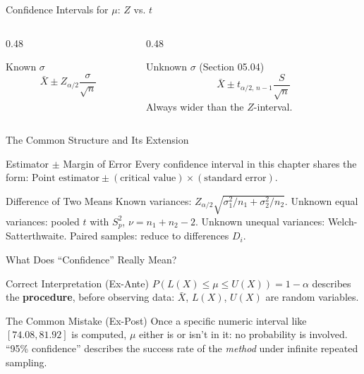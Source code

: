 \documentclass[aspectratio=169,xcolor={dvipsnames,table}]{beamer}
\begin{document}
\begin{frame}{Confidence Intervals for $\mu$: $Z$ vs. $t$}
	\vspace{-0.15cm}
	\begin{columns}[T]
		\begin{column}{0.48\textwidth}
			\begin{block}{Known $\sigma$}
				\footnotesize
				$$\bar X \pm Z_{\alpha/2}\dfrac{\sigma}{\sqrt n}$$
			\end{block}
		\end{column}
		\begin{column}{0.48\textwidth}
			\begin{alertblock}{Unknown $\sigma$ (Section 05.04)}
				\footnotesize
				$$\bar X \pm t_{\alpha/2,\,n-1}\dfrac{S}{\sqrt n}$$
				Always wider than the $Z$-interval.
			\end{alertblock}
		\end{column}
	\end{columns}
\end{frame}

\begin{frame}{The Common Structure and Its Extension}
	\vspace{-0.15cm}
	\begin{block}{Estimator $\pm$ Margin of Error}
		\footnotesize
		Every confidence interval in this chapter shares the form: $\text{Point estimator} \pm (\text{critical value}) \times (\text{standard error})$.
	\end{block}
	\pause
	\vspace{0.1cm}
	\begin{alertblock}{Difference of Two Means}
		\footnotesize
		Known variances: $Z_{\alpha/2}\sqrt{\sigma_1^2/n_1+\sigma_2^2/n_2}$. Unknown equal variances: pooled $t$ with $S_p^2$, $\nu=n_1+n_2-2$. Unknown unequal variances: Welch-Satterthwaite. Paired samples: reduce to differences $D_i$.
	\end{alertblock}
\end{frame}

\begin{frame}{What Does ``Confidence'' Really Mean?}
	\vspace{-0.15cm}
	\begin{block}{Correct Interpretation (Ex-Ante)}
		\footnotesize
		$P(L(X) \le \mu \le U(X)) = 1-\alpha$ describes the \textbf{procedure}, before observing data: $\bar X$, $L(X)$, $U(X)$ are random variables.
	\end{block}
	\pause
	\vspace{0.1cm}
	\begin{alertblock}{The Common Mistake (Ex-Post)}
		\footnotesize
		Once a specific numeric interval like $[74.08, 81.92]$ is computed, $\mu$ either is or isn't in it: no probability is involved. ``95\% confidence'' describes the success rate of the \emph{method} under infinite repeated sampling.
	\end{alertblock}
\end{frame}
\end{document}
